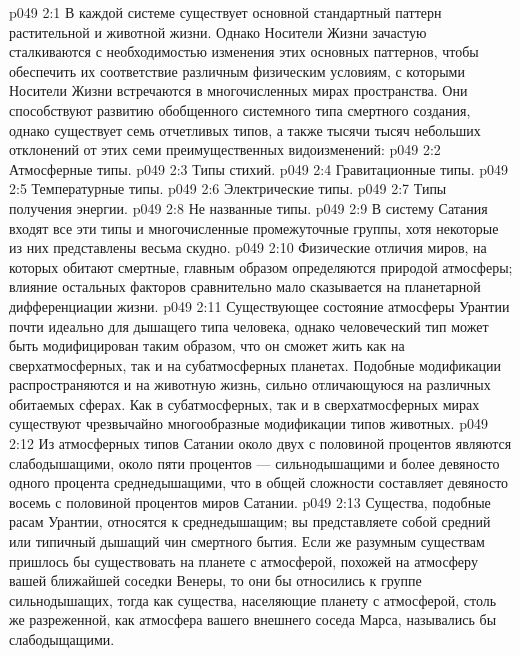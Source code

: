 \vs p049 2:1 В каждой системе существует основной стандартный паттерн растительной и животной жизни. Однако Носители Жизни зачастую сталкиваются с необходимостью изменения этих основных паттернов, чтобы обеспечить их соответствие различным физическим условиям, с которыми Носители Жизни встречаются в многочисленных мирах пространства. Они способствуют развитию обобщенного системного типа смертного создания, однако существует семь отчетливых типов, а также тысячи тысяч небольших отклонений от этих семи преимущественных видоизменений:
\vs p049 2:2 \bibnobreakspace Атмосферные типы.
\vs p049 2:3 \bibnobreakspace Типы стихий.
\vs p049 2:4 \bibnobreakspace Гравитационные типы.
\vs p049 2:5 \bibnobreakspace Температурные типы.
\vs p049 2:6 \bibnobreakspace Электрические типы.
\vs p049 2:7 \bibnobreakspace Типы получения энергии.
\vs p049 2:8 \bibnobreakspace Не названные типы.
\vs p049 2:9 \pc В систему Сатания входят все эти типы и многочисленные промежуточные группы, хотя некоторые из них представлены весьма скудно.
\vs p049 2:10 \pc {}\bibnobreakspace {} Физические отличия миров, на которых обитают смертные, главным образом определяются природой атмосферы; влияние остальных факторов сравнительно мало сказывается на планетарной дифференциации жизни.
\vs p049 2:11 Существующее состояние атмосферы Урантии почти идеально для дышащего типа человека, однако человеческий тип может быть модифицирован таким образом, что он сможет жить как на сверхатмосферных, так и на субатмосферных планетах. Подобные модификации распространяются и на животную жизнь, сильно отличающуюся на различных обитаемых сферах. Как в субатмосферных, так и в сверхатмосферных мирах существуют чрезвычайно многообразные модификации типов животных.
\vs p049 2:12 Из атмосферных типов Сатании около двух с половиной процентов являются слабодышащими, около пяти процентов --- сильнодышащими и более девяносто одного процента среднедышащими, что в общей сложности составляет девяносто восемь с половиной процентов миров Сатании.
\vs p049 2:13 Существа, подобные расам Урантии, относятся к среднедышащим; вы представляете собой средний или типичный дышащий чин смертного бытия. Если же разумным существам пришлось бы существовать на планете с атмосферой, похожей на атмосферу вашей ближайшей соседки Венеры, то они бы относились к группе сильнодышащих, тогда как существа, населяющие планету с атмосферой, столь же разреженной, как атмосфера вашего внешнего соседа Марса, назывались бы слабодыщащими.
